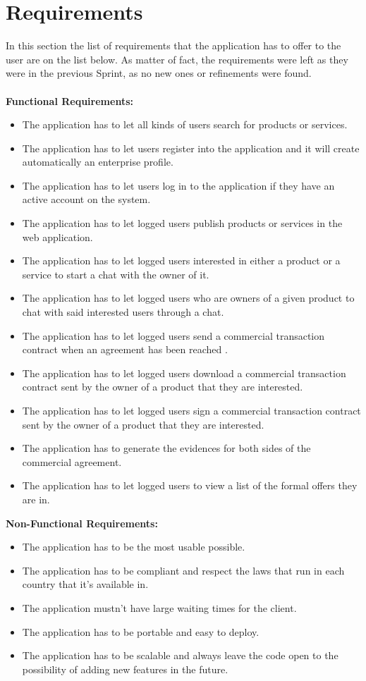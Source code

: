 \documentclass[./main.tex]{subfiles}
\begin{document}
\section{Requirements}
In this section the list of requirements that the application has to offer to the user are on the list below. As matter of fact, the requirements were left as they were in the previous Sprint, as no new ones or refinements were found. 
\\\\
\textbf{Functional Requirements:}
\begin{itemize}
	
	\item
	The application has to let all kinds of users search for products or
	services.
	\item
	The application has to let users register into the application and it will create automatically an enterprise profile.
	\item
	The application has to let users log in to the application if they
	have an active account on the system.
	\item
	The application has to let logged users publish products or services in the web application.
	\item
	The application has to let logged users interested in either a product
	or a service to start a chat with the owner of it.
	\item
	The application has to let logged users who are owners of a given
	product to chat with said interested users through a chat.
	\item
	The application has to let logged users send a commercial transaction
	contract when an agreement has been reached .
	\item 
	The application has to let logged users download a commercial transaction
	contract sent by the owner of a product that they are interested.
	\item
	The application has to let logged users sign a commercial transaction
	contract sent by the owner of a product that they are interested.
	\item
	The application has to generate the evidences for both sides of the
	commercial agreement.
	\item The application has to let logged users to view a list of the formal offers they are in.
\end{itemize}
\textbf{Non-Functional Requirements:}
\begin{itemize}
	
	\item
	The application has to be the most usable possible.
	\item
	The application has to be compliant and respect the laws that run in
	each country that it's available in.
	\item
	The application mustn't have large waiting times for the client.
	\item
	The application has to be portable and easy to deploy.
	\item
	The application has to be scalable and always leave the code open to
	the possibility of adding new features in the future.
\end{itemize}
\end{document}

